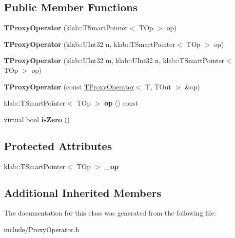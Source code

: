 \subsection*{Public Member Functions}
\begin{DoxyCompactItemize}
\item 
{\bfseries T\+Proxy\+Operator} (klab\+::\+T\+Smart\+Pointer$<$ T\+Op $>$ op)\hypertarget{classkl1p_1_1TProxyOperator_a66f11e902f68a36decfe3da7eaf147fd}{}\label{classkl1p_1_1TProxyOperator_a66f11e902f68a36decfe3da7eaf147fd}

\item 
{\bfseries T\+Proxy\+Operator} (klab\+::\+U\+Int32 n, klab\+::\+T\+Smart\+Pointer$<$ T\+Op $>$ op)\hypertarget{classkl1p_1_1TProxyOperator_a679bab9032a9fa1e8ffe4723d6c7e216}{}\label{classkl1p_1_1TProxyOperator_a679bab9032a9fa1e8ffe4723d6c7e216}

\item 
{\bfseries T\+Proxy\+Operator} (klab\+::\+U\+Int32 m, klab\+::\+U\+Int32 n, klab\+::\+T\+Smart\+Pointer$<$ T\+Op $>$ op)\hypertarget{classkl1p_1_1TProxyOperator_a7dc790116e4531d8e5c55bfafcb3a5fc}{}\label{classkl1p_1_1TProxyOperator_a7dc790116e4531d8e5c55bfafcb3a5fc}

\item 
{\bfseries T\+Proxy\+Operator} (const \hyperlink{classkl1p_1_1TProxyOperator}{T\+Proxy\+Operator}$<$ T, T\+Out $>$ \&op)\hypertarget{classkl1p_1_1TProxyOperator_afa7f557a2cff571d313480d2d8e90990}{}\label{classkl1p_1_1TProxyOperator_afa7f557a2cff571d313480d2d8e90990}

\item 
klab\+::\+T\+Smart\+Pointer$<$ T\+Op $>$ {\bfseries op} () const \hypertarget{classkl1p_1_1TProxyOperator_a938f8d5cc5c3142f02bf7bd5cb4f6795}{}\label{classkl1p_1_1TProxyOperator_a938f8d5cc5c3142f02bf7bd5cb4f6795}

\item 
virtual bool {\bfseries is\+Zero} ()\hypertarget{classkl1p_1_1TProxyOperator_aff6819d1efd87adfc0131909810b9ed8}{}\label{classkl1p_1_1TProxyOperator_aff6819d1efd87adfc0131909810b9ed8}

\end{DoxyCompactItemize}
\subsection*{Protected Attributes}
\begin{DoxyCompactItemize}
\item 
klab\+::\+T\+Smart\+Pointer$<$ T\+Op $>$ {\bfseries \+\_\+op}\hypertarget{classkl1p_1_1TProxyOperator_a7ad442852084ac92a219fa3f88377abd}{}\label{classkl1p_1_1TProxyOperator_a7ad442852084ac92a219fa3f88377abd}

\end{DoxyCompactItemize}
\subsection*{Additional Inherited Members}


The documentation for this class was generated from the following file\+:\begin{DoxyCompactItemize}
\item 
include/Proxy\+Operator.\+h\end{DoxyCompactItemize}
